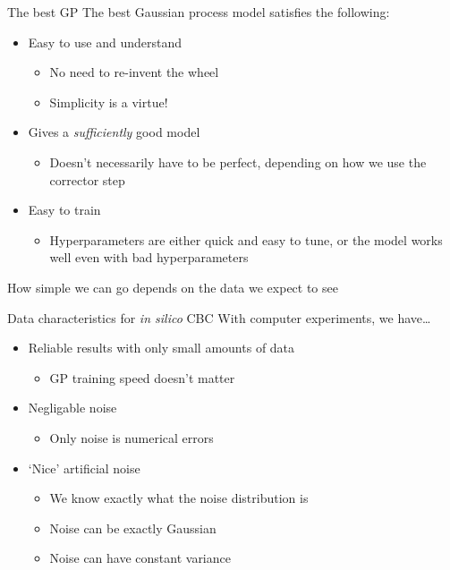 \documentclass[presentation]{beamer}
\begin{document}
\begin{frame}[label={sec:org3ea5129}]{The best GP}
The best Gaussian process model satisfies the following:

\vfill

\begin{itemize}
\item Easy to use and understand
\begin{itemize}
\item No need to re-invent the wheel
\item Simplicity is a virtue!
\end{itemize}
\item Gives a \emph{sufficiently} good model
\begin{itemize}
\item Doesn't necessarily have to be perfect, depending on how we use the corrector step
\end{itemize}
\item Easy to train
\begin{itemize}
\item Hyperparameters are either quick and easy to tune, or the model works well even with bad hyperparameters
\end{itemize}
\end{itemize}

\vfill

How simple we can go depends on the data we expect to see
\end{frame}

\begin{frame}[label={sec:orgd2e1d58}]{Data characteristics for \emph{in silico} CBC}
With computer experiments, we have\ldots{}

\vfill

\begin{itemize}
\item Reliable results with only small amounts of data
\begin{itemize}
\item GP training speed doesn't matter
\end{itemize}
\item Negligable noise
\begin{itemize}
\item Only noise is numerical errors
\end{itemize}
\item `Nice' artificial noise
\begin{itemize}
\item We know exactly what the noise distribution is
\item Noise can be exactly Gaussian
\item Noise can have constant variance
\end{itemize}
\end{itemize}
\end{frame}
\end{document}
